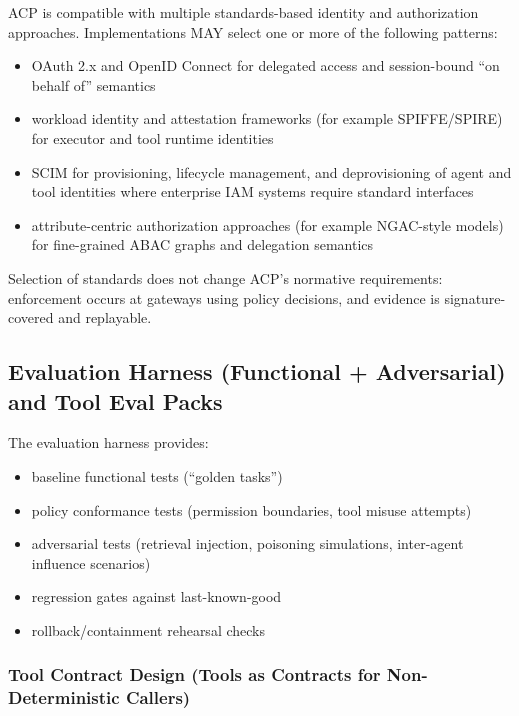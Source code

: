 \documentclass[11pt]{article}
\begin{document}
ACP is compatible with multiple standards-based identity and
authorization approaches. Implementations MAY select one or more of the
following patterns:

\begin{itemize}
\tightlist
\item
  OAuth 2.x and OpenID Connect for delegated access and session-bound
  ``on behalf of'' semantics
\item
  workload identity and attestation frameworks (for example
  SPIFFE/SPIRE) for executor and tool runtime identities
\item
  SCIM for provisioning, lifecycle management, and deprovisioning of
  agent and tool identities where enterprise IAM systems require
  standard interfaces
\item
  attribute-centric authorization approaches (for example NGAC-style
  models) for fine-grained ABAC graphs and delegation semantics
\end{itemize}

Selection of standards does not change ACP's normative requirements:
enforcement occurs at gateways using policy decisions, and evidence is
signature-covered and replayable.

\hypertarget{evaluation-harness-functional-adversarial-and-tool-eval-packs}{%
\subsection{Evaluation Harness (Functional + Adversarial) and Tool Eval Packs}\label{evaluation-harness-functional-adversarial-and-tool-eval-packs}}

The evaluation harness provides:

\begin{itemize}
\tightlist
\item
  baseline functional tests (``golden tasks'')
\item
  policy conformance tests (permission boundaries, tool misuse attempts)
\item
  adversarial tests (retrieval injection, poisoning simulations,
  inter-agent influence scenarios)
\item
  regression gates against last-known-good
\item
  rollback/containment rehearsal checks
\end{itemize}

\hypertarget{tool-contract-design-tools-as-contracts-for-non-deterministic-callers}{%
\subsubsection{Tool Contract Design (Tools as Contracts for Non-Deterministic Callers)}\label{tool-contract-design-tools-as-contracts-for-non-deterministic-callers}}
\end{document}
